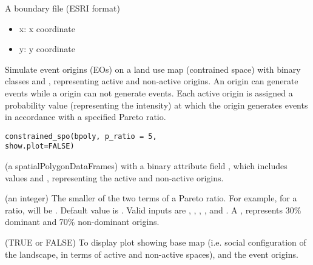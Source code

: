 \documentclass[a4paper]{book}
\begin{document}
%
\begin{Format}
A boundary file (ESRI format)
\begin{itemize}

\item{} x: x coordinate
\item{} y: y coordinate

\end{itemize}

\end{Format}
%
\begin{Description}\relax
Simulate event origins (EOs) on a land use map
(contrained space) with binary classes  and , representing
active and non-active origins. An  origin can
generate events while a  origin can not generate
events. Each active origin is assigned
a probability value (representing the intensity) at which
the origin generates events in accordance with a specified
Pareto ratio.
\end{Description}
%
\begin{Usage}
\begin{verbatim}
constrained_spo(bpoly, p_ratio = 5,
show.plot=FALSE)
\end{verbatim}
\end{Usage}
%
\begin{Arguments}
\begin{ldescription}
\item[\code{bpoly}] (a spatialPolygonDataFrames) with a binary attribute
field , which includes values  and , representing
the active and non-active origins.

\item[\code{p\_ratio}] (an integer) The smaller of the
two terms of a Pareto ratio. For example, for a 
ratio,  will be . Default value is
. Valid inputs are , ,
, , and . A , represents
30\% dominant and 70\% non-dominant origins.

\item[\code{show.plot}] (TRUE or FALSE) To display plot showing
base map (i.e. social configuration of the landscape, in
terms of active and non-active spaces), and the event origins.
\end{ldescription}
\end{Arguments}
\end{document}
